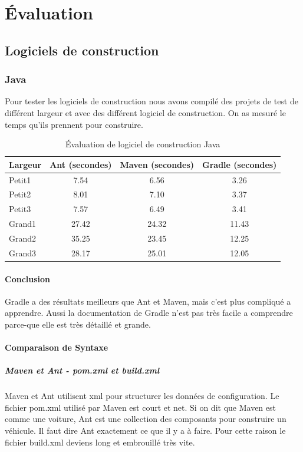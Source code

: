 \chapter{Évaluation}
\label{eval}

\section{Logiciels de construction}
\subsection{Java}
Pour tester les logiciels de construction nous avons compilé des projets de test de différent largeur et avec des différent logiciel de construction. On as mesuré le temps qu'ils prennent pour construire.

\begin{table}[H]
\centering
\begin{tabular}{l|ccc} \toprule
	\textbf{Largeur} & \textbf{Ant (secondes)} & \textbf{Maven (secondes)} & \textbf{Gradle (secondes)}\\ \midrule
	Petit1 & 7.54 & 6.56 & 3.26\\
	Petit2 & 8.01 & 7.10 & 3.37\\
	Petit3 & 7.57 & 6.49 & 3.41\\
	Grand1 & 27.42 & 24.32 & 11.43\\
	Grand2 & 35.25 & 23.45 & 12.25\\
	Grand3 & 28.17 & 25.01 & 12.05\\ \bottomrule
\end{tabular}
\caption{Évaluation de logiciel de construction Java}
\end{table}
\subsubsection{Conclusion}
Gradle a des résultats meilleurs que Ant et Maven, mais c'est plus compliqué a apprendre. Aussi la documentation de Gradle n'est pas très facile a comprendre parce-que elle est très détaillé et grande.

\subsubsection{Comparaison de Syntaxe}
	\paragraph{Maven et Ant - pom.xml et build.xml}
		Maven et Ant utilisent xml pour structurer les données de configuration. Le fichier pom.xml utilisé par Maven est court et net. Si on dit que Maven est comme une voiture, Ant est une collection des composants pour construire un véhicule. Il faut dire Ant exactement ce que il y a à faire. Pour cette raison le fichier build.xml deviens long et embrouillé très vite.

